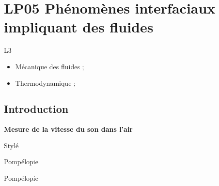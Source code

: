 \section{LP05 Phénomènes interfaciaux impliquant des fluides}

\niveau L3

\prerequis
\begin{itemize}
\item Mécanique des fluides ;
\item Thermodynamique ;
\end{itemize}

\objectif 

\footnotesize{}

\subsection{Introduction}

\begin{experience}
\textbf{Mesure de la vitesse du son dans l'air}
\end{experience}
\begin{slide}
Stylé
\end{slide}
\begin{transition}
Pompélopie
\end{transition}
\begin{remarque}
Pompélopie
\end{remarque}
